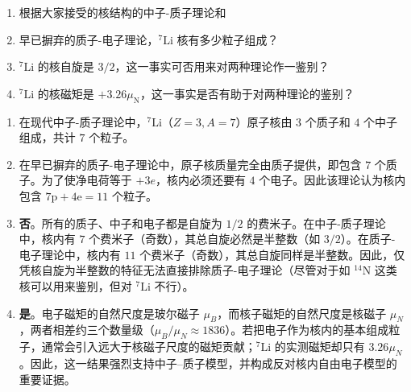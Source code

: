 \begin{exercise}\label{ex:29.9}
\begin{enumerate}
  \item[(a)] 根据大家接受的核结构的中子-质子理论和
  \item[(b)] 早已摒弃的质子-电子理论，$^7\mathrm{Li}$ 核有多少粒子组成？
  \item[(c)] $^7\mathrm{Li}$ 的核自旋是 $3/2$，这一事实可否用来对两种理论作一鉴别？
  \item[(d)] $^7\mathrm{Li}$ 的核磁矩是 $+3.26\mu_{\mathrm{N}}$，这一事实是否有助于对两种理论的鉴别？
\end{enumerate}
\end{exercise}
\begin{solution}
\begin{enumerate}
    \item[(a)] 在现代中子-质子理论中，$^7\mathrm{Li}$（$Z=3, A=7$）原子核由 $3$ 个质子和 $4$ 个中子组成，共计 $7$ 个粒子。
    
    \item[(b)] 在早已摒弃的质子-电子理论中，原子核质量完全由质子提供，即包含 $7$ 个质子。为了使净电荷等于 $+3e$，核内必须还要有 $4$ 个电子。因此该理论认为核内包含 $7\mathrm{p} + 4\mathrm{e} = 11$ 个粒子。
    
    \item[(c)] \textbf{否}。所有的质子、中子和电子都是自旋为 $1/2$ 的费米子。在中子-质子理论中，核内有 $7$ 个费米子（奇数），其总自旋必然是半整数（如 $3/2$）。在质子-电子理论中，核内有 $11$ 个费米子（奇数），其总自旋同样是半整数。因此，仅凭核自旋为半整数的特征无法直接排除质子-电子理论（尽管对于如 $^{14}\mathrm{N}$ 这类核可以用来鉴别，但对 $^7\mathrm{Li}$ 不行）。
    
    \item[(d)] \textbf{是}。电子磁矩的自然尺度是玻尔磁子 $\mu_B$，而核子磁矩的自然尺度是核磁子 $\mu_N$，两者相差约三个数量级（$\mu_B/\mu_N\approx1836$）。若把电子作为核内的基本组成粒子，通常会引入远大于核磁子尺度的磁矩贡献；$^7\mathrm{Li}$ 的实测磁矩却只有 $3.26\mu_N$。因此，这一结果强烈支持中子--质子模型，并构成反对核内自由电子模型的重要证据。
\end{enumerate}
\end{solution}

